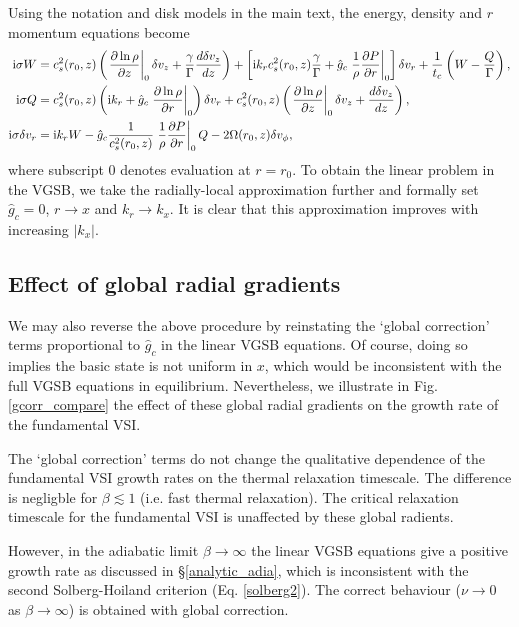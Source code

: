 Using the notation and disk models in the main text, the
energy, density and $r$ momentum equations become 
\begin{align}
  \mathrm{i} \sigma W  &=c _s^2(r_0, z)\left( \left.\frac{\partial\ln\rho}{\partial
      z}\right|_0 \delta v_z + \frac{\gamma}{\Gamma} \frac{d\delta
    v_z}{dz}\right) + \left[\mathrm{i} k_rc_s^2(r_0,z)
  \frac{\gamma}{\Gamma} + \hat{g}_c\left.\frac{1}{\rho}\frac{\partial P}{\partial
      r}\right|_0\right]\delta v_r  +
\frac{1}{t_c}\left(W-\frac{Q}{\Gamma}\right),\label{gcorr_terms1}\\
\mathrm{i} \sigma Q &= c_s^2(r_0,z)\left(\mathrm{i} k_r + \hat{g}_c
  \left.\frac{\partial\ln{\rho}}{\partial r}\right|_0\right)\delta v_r + c _s^2(r_0, z)\left( \left.\frac{\partial\ln\rho}{\partial
      z}\right|_0 \delta v_z + \frac{d\delta
    v_z}{dz}\right),\label{gcorr_terms2} \\
\mathrm{i} \sigma \delta v_r & = \mathrm{i} k_r W  -
\hat{g}_c\frac{1}{c_s^2(r_0,z)}\left.\frac{1}{\rho}\frac{\partial P}{\partial
  r}\right|_0Q - 2\Omega(r_0,z)\delta v_\phi,\label{gcorr_terms3}
\end{align}
where subscript $0$ denotes evaluation at $r=r_0$. To obtain the
linear problem in the VGSB, we take the radially-local 
approximation further and formally set $\hat{g}_c=0$, $r\to x$ and
$k_r\to k_x$. It is clear that this approximation improves with
increasing $|k_x|$.   


\subsection{Effect of global radial gradients}
We may also reverse the above procedure by reinstating the `global
correction' terms proportional to $\hat{g}_c$ in the linear VGSB
equations. Of course, doing so implies the basic state is not uniform
in $x$, which would be inconsistent with the full VGSB equations in
equilibrium. Nevertheless, we illustrate in Fig. \ref{gcorr_compare} the effect of
these global radial gradients on the growth rate of the fundamental
VSI.  

The `global correction' terms do not change the qualitative dependence
of the fundamental VSI growth rates on the thermal relaxation
timescale. The difference is negligble for $\beta\lesssim 1$ (i.e.
fast thermal relaxation). The critical relaxation timescale for the
fundamental VSI is unaffected by these global radients. 

However, in the adiabatic limit $\beta\to\infty$ the linear VGSB
equations give a positive growth rate as discussed in
\S\ref{analytic_adia}, which is inconsistent with the second
Solberg-Hoiland criterion (Eq. \ref{solberg2}). The correct behaviour
($\nu\to0$ as $\beta\to\infty$) is obtained with global correction.  

